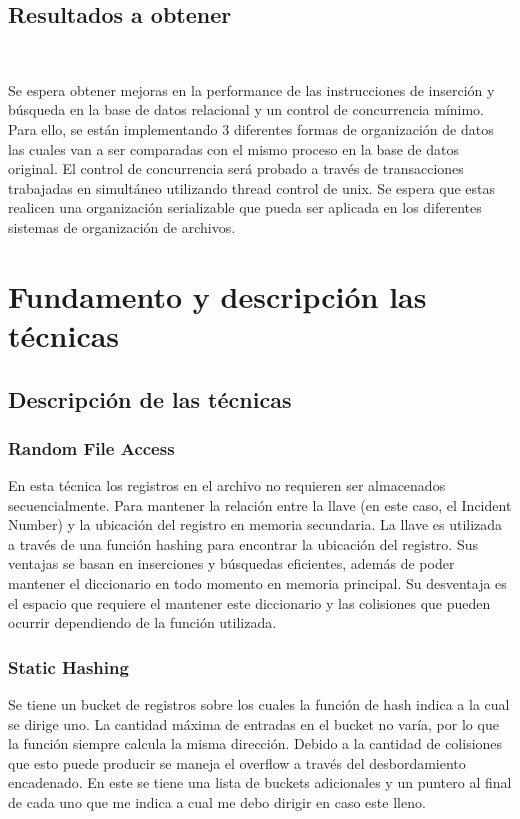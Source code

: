 \documentclass{article}
\begin{document}
    \subsection{Resultados a obtener} 

      Se espera obtener mejoras en la performance de las instrucciones de inserción y búsqueda en la base de datos relacional y un control de concurrencia mínimo. Para ello, se están implementando 3 diferentes formas de organización de datos las cuales van a ser comparadas con el mismo proceso en la base de datos original. El control de concurrencia será probado a través de transacciones trabajadas en simultáneo utilizando thread control de unix. Se espera que estas realicen una organización serializable que pueda ser aplicada en los diferentes sistemas de organización de archivos.

  \section{Fundamento y descripción las técnicas} 

    \subsection{Descripción de las técnicas}

      \subsubsection{Random File Access}

        En esta técnica los registros en el archivo no requieren ser almacenados secuencialmente. Para mantener la relación entre la llave (en este caso, el Incident Number) y la ubicación del registro en memoria secundaria. La llave es utilizada a través de una función hashing para encontrar la ubicación del registro. Sus ventajas se basan en inserciones y búsquedas eficientes, además de poder mantener el diccionario en todo momento en memoria principal. Su desventaja es el espacio que requiere el mantener este diccionario y las colisiones que pueden ocurrir dependiendo de la función utilizada.

      \subsubsection{Static Hashing}
        
        Se tiene un bucket de registros sobre los cuales la función de hash indica a la cual se dirige uno. La cantidad máxima de entradas en el bucket no varía, por lo que la función siempre calcula la misma dirección. Debido a la cantidad de colisiones que esto puede producir se maneja el overflow a través del desbordamiento encadenado. En este se tiene una lista de buckets adicionales y un puntero al final de cada uno que me indica a cual me debo dirigir en caso este lleno.
\end{document}
